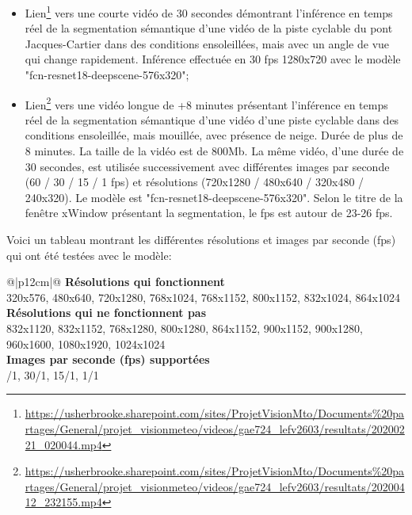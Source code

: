 \begin{itemize}
   \item Lien\footnote{\url{https://usherbrooke.sharepoint.com/sites/ProjetVisionMto/Documents\%20partages/General/projet_visionmeteo/videos/gae724_lefv2603/resultats/20200221_020044.mp4}} vers une courte vidéo de 30 secondes démontrant l'inférence en temps réel de la segmentation sémantique d'une vidéo de la piste cyclable du pont Jacques-Cartier dans des conditions ensoleillées, mais avec un angle de vue qui change rapidement. Inférence effectuée en 30 \acrshort{fps} 1280x720 avec le modèle "fcn-resnet18-deepscene-576x320";
   \item Lien\footnote{\url{https://usherbrooke.sharepoint.com/sites/ProjetVisionMto/Documents\%20partages/General/projet_visionmeteo/videos/gae724_lefv2603/resultats/20200412_232155.mp4}} vers une vidéo longue de +8 minutes présentant l'inférence en temps réel de la segmentation sémantique d'une vidéo d'une piste cyclable dans des conditions ensoleillée, mais mouillée, avec présence de neige. Durée de plus de 8 minutes. La taille de la vidéo est de 800Mb. La même vidéo, d'une durée de 30 secondes, est utilisée successivement avec différentes images par seconde (60 / 30 / 15 / 1 \acrshort{fps}) et résolutions (720x1280 / 480x640 / 320x480 / 240x320). Le modèle est "fcn-resnet18-deepscene-576x320". Selon le titre de la fenêtre xWindow présentant la segmentation, le \acrshort{fps} est autour de 23-26 \acrshort{fps}.
\end{itemize}
\par Voici un tableau montrant les différentes résolutions et images par seconde (\acrshort{fps}) qui ont été testées avec le modèle:
{
    \renewcommand*{\arraystretch}{1.4}
    \begin{table}[ht]
    \centering
    \caption{Résolutions et images par seconde (\acrshort{fps}) testés}\label{table:resolutions_tested}
    \vspace{0.1em} %
    \begin{tabular}{{@{}|p{12cm}|@{}}}
         \hline
         \textbf{Résolutions qui fonctionnent}\\
         \hline
        320x576, 480x640, 720x1280, 768x1024, 768x1152, 800x1152, 832x1024, 864x1024\\
        \hline
        \textbf{Résolutions qui ne fonctionnent pas}\\
        \hline
        832x1120, 832x1152, 768x1280, 800x1280, 864x1152, 900x1152, 900x1280, 960x1600, 1080x1920, 1024x1024\\
        \hline
        \textbf{Images par seconde (\acrshort{fps}) supportées}\\
        /1, 30/1, 15/1, 1/1\\
        \hline
    \end{tabular}
    \end{table}
}
